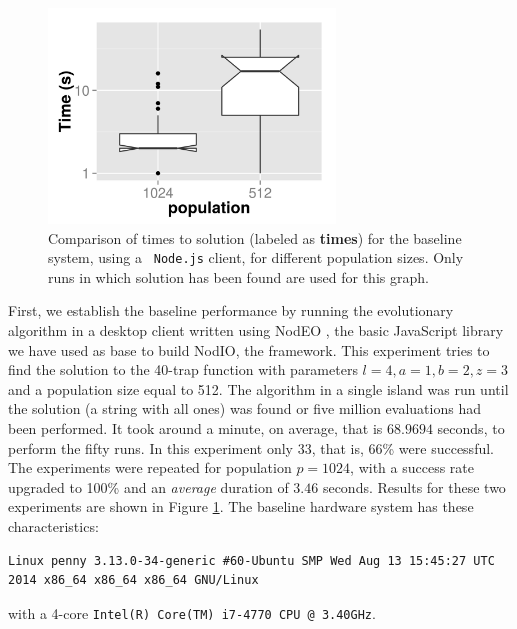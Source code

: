\documentclass[letterpaper]{article}
\begin{document}
\begin{figure}[!t]
\centering
\includegraphics[width=3in]{baseline-times.png}
\caption{Comparison of times to solution (labeled as {\bf times}) for the baseline system, using a {\tt
    Node.js} client, for different population sizes. Only
runs in which solution has been found are used for this graph.}
\label{fig:baseline}
\end{figure}
First, we establish the baseline performance by running the
evolutionary algorithm in a desktop client written using {\sf NodEO}
\citep{nodeo2014}, the basic JavaScript library we have used as base to
build {\sf NodIO}, the framework. This experiment tries to 
find the solution to the 40-trap function with parameters $l=4, a=1,
b=2, z=3$ and a population size equal to 512. The algorithm in a
single island was run until the solution (a string with all
ones) was found or five million evaluations had been performed. It
took around a minute, on average, that is $68.9694$ seconds, to
perform the fifty runs. In this experiment only 33, that is, 66\% were
successful. The experiments were repeated for population $p=1024$,
with a success rate upgraded to 100\% and an {\em average} duration of $3.46$
seconds. Results for these two experiments
are shown in Figure \ref{fig:baseline}. The baseline hardware system has these
characteristics: 
\begin{verbatim}
Linux penny 3.13.0-34-generic #60-Ubuntu SMP Wed Aug 13 15:45:27 UTC
2014 x86_64 x86_64 x86_64 GNU/Linux
\end{verbatim}
with a 4-core {\tt Intel(R) Core(TM) i7-4770 CPU @ 3.40GHz}.
\end{document}
